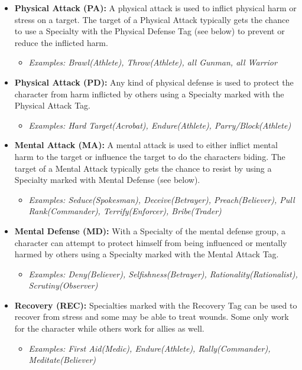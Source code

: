 \begin{itemize}
	\item \textbf{Physical Attack (PA):} A physical attack is used to inflict physical harm or stress on a target. The target of a Physical Attack typically gets the chance to use a Specialty with the Physical Defense Tag (see below) to prevent or reduce the inflicted harm.
	\begin{itemize}
		\item \textit{Examples: Brawl(Athlete), Throw(Athlete), all Gunman, all Warrior}
	\end{itemize}
	\item \textbf{Physical Attack (PD):} Any kind of physical defense is used to protect the character from harm inflicted by others using a Specialty marked with the Physical Attack Tag.
	\begin{itemize}
		\item \textit{Examples: Hard Target(Acrobat), Endure(Athlete), Parry/Block(Athlete)}
	\end{itemize}
	\item \textbf{Mental Attack (MA):} A mental attack is used to either inflict mental harm to the target or influence the target to do the characters biding. The target of a Mental Attack typically gets the chance to resist by using a Specialty marked with Mental Defense (see below).
	\begin{itemize}
		\item \textit{Examples: Seduce(Spokesman), Deceive(Betrayer), Preach(Believer), Pull Rank(Commander), Terrify(Enforcer), Bribe(Trader)}
	\end{itemize}
	\item \textbf{Mental Defense (MD):} With a Specialty of the mental defense group, a character can attempt to protect himself from being influenced or mentally harmed by others using a Specialty marked with the Mental Attack Tag.
	\begin{itemize}
		\item \textit{Examples: Deny(Believer), Selfishness(Betrayer), Rationality(Rationalist), Scrutiny(Observer)}
	\end{itemize}
		\item \textbf{Recovery (REC):} Specialties marked with the Recovery Tag can be used to recover from stress and some may be able to treat wounds. Some only work for the character while others work for allies as well.
	\begin{itemize}
		\item \textit{Examples: First Aid(Medic), Endure(Athlete), Rally(Commander), Meditate(Believer)}

\end{itemize}
\end{itemize}
